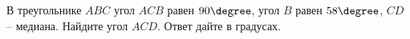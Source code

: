 \begin{ex}
	\begin{condition}
		 В треугольнике \( ABC \) угол \( ACB \) равен \( 90\degree \), угол \( B \) равен \( 58 \degree\), \( CD \) – медиана. Найдите угол \( ACD \). Ответ дайте в градусах.
	\end{condition}
\end{ex}